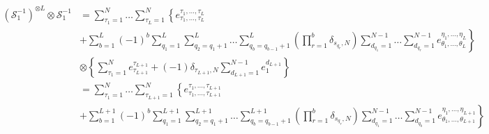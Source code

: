 \documentclass[10pt]{article}
\numberwithin{equation}{section}
\numberwithin{equation}{subsection}
\begin{document}
		\begin{align*}
			\left(\mathcal{S}_{1}^{-1}\right)^{\otimes L}\otimes \mathcal{S}_{1}^{-1}&=
			\sum_{\tau_{1}=1}^{N}\ldots\sum_{\tau_{L}=1}^{N}\left\{e_{\tau_{1},\ldots,\tau_{L}}^{\tau_{1},\ldots,\tau_{L}}\right. \\&+\left. \sum_{b=1}^{L}(-1)^{b}\sum_{q_{1}=1}^{L}\sum_{q_{2}=q_{1}+1}^{L}\ldots\sum_{q_{b}=q_{b-1}+1}^{L}\left(\prod_{r=1}^{b}\delta_{s_{q_{r}},N}\right)\sum_{d_{q_{1}}=1}^{N-1}\ldots\sum_{d_{q_{r}}=1}^{N-1}e_{\theta_{1},\ldots,\theta_{L}}^{\eta_{1},\ldots,\eta_{L}}\right\}
			\\&\otimes
			\left\{ \sum_{\tau_{1}=1}^{N}e_{\tau_{L+1}}^{\tau_{L+1}}+(-1)\delta_{\tau_{L+1},N}\sum_{d_{L+1}=1}^{N-1}e_{1}^{d_{L+1}}\right\}
			\\&=
			\sum_{\tau_{1}=1}^{N}\ldots\sum_{\tau_{L+1}=1}^{N}\left\{e_{\tau_{1},\ldots,\tau_{L+1}}^{\tau_{1},\ldots,\tau_{L+1}}\right. \\&+\left. \sum_{b=1}^{L+1}(-1)^{b}\sum_{q_{1}=1}^{L+1}\sum_{q_{2}=q_{1}+1}^{L+1}\ldots\sum_{q_{b}=q_{b-1}+1}^{L+1}\left(\prod_{r=1}^{b}\delta_{s_{q_{r}},N}\right)\sum_{d_{q_{1}}=1}^{N-1}\ldots\sum_{d_{q_{b}}=1}^{N-1}e_{\theta_{1},\ldots,\theta_{L+1}}^{\eta_{1},\ldots,\eta_{L+1}}\right\}
		\end{align*}
\end{document}
